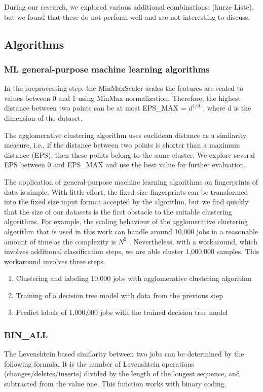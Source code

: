 \documentclass[]{llncs}
\begin{document}
During our research, we explored various additional combinations: (kurze Liste), but we found that these do not perform well and are not interesting to discuss.

\subsection{Algorithms }
\subsubsection{ML general-purpose machine learning algorithms}
In the preprocessing step, the MinMaxScaler scales the features are scaled to values between 0 and 1 using MinMax normalization.
Therefore, the highest distance between two points can be at most EPS\_MAX =  \( d^{1/d} \) , where d is the dimension of the dataset.


The agglomerative clustering algorithm uses euclidean distance as a similarity measure, i.e., if the distance between two points is shorter than a maximum distance (EPS), then these points belong to the same cluster.
We explore several EPS between 0 and EPS\_MAX and use the best value for further evaluation.


The application of general-purpose machine learning algorithms on fingerprints of data is simple.
With little effort, the fixed-size fingerprints can be transformed into the fixed size input format accepted by the algorithm, but we find quickly that the size of our datasets is the first obstacle to the suitable clustering algorithms.
For example, the scaling behaviour of the agglomerative clustering algorithm that is used in this work can handle around 10,000 jobs in a reasonable amount of time as the complexity is  \( N^{2} \) .
Nevertheless, with a workaround, which involves additional classification steps, we are able cluster 1,000,000 samples.
This workaround involves three steps.

\begin{enumerate}
 \item Clustering and labeling 10,000 jobs with agglomerative clustering algorithm
 \item Training of a decision tree model with data from the previous step
 \item Predict labels of 1,000,000 jobs with the trained decision tree model
\end{enumerate}

\subsubsection{BIN\_ALL}
The Levenshtein based similarity between two jobs can be determined by the following formula.
It is the number of Levenshtein operations (changes/deletes/inserts) divided by the length of the longest sequence, and subtracted from the value one.
This function works with binary coding.
\end{document}
